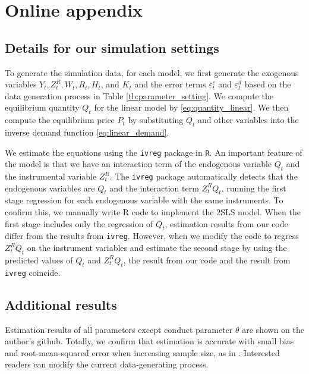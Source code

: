 \documentclass[11pt, a4paper]{article}
\begin{document}



\newpage

\setcounter{page}{1}
\appendix
\section{Online appendix}\label{sec:appendix}

\subsection{Details for our simulation settings}

To generate the simulation data, for each model, we first generate the exogenous variables $Y_{t}, Z^{R}_{t}, W_{t}, R_{t}, H_{t}$, and $K_{t}$ and the error terms $\varepsilon_{t}^c$ and $\varepsilon_{t}^d$ based on the data generation process in Table \ref{tb:parameter_setting}.
We compute the equilibrium quantity $Q_{t}$ for the linear model by \eqref{eq:quantity_linear}.
We then compute the equilibrium price $P_{t}$ by substituting $Q_{t}$ and other variables into the inverse demand function \eqref{eq:linear_demand}.

We estimate the equations using the \texttt{ivreg} package in \texttt{R}.
An important feature of the model is that we have an interaction term of the endogenous variable $Q_{t}$ and the instrumental variable $Z^{R}_{t}$.
The \texttt{ivreg} package automatically detects that the endogenous variables are $Q_{t}$ and the interaction term $Z^{R}_{t}Q_{t}$, running the first stage regression for each endogenous variable with the same instruments. To confirm this, we manually write R code to implement the 2SLS model. 
When the first stage includes only the regression of $Q_{t}$, estimation results from our code differ from the results from \texttt{ivreg}. 
However, when we modify the code to regress $Z^{R}_{t}Q_{t}$ on the instrument variables and estimate the second stage by using the predicted values of $Q_{t}$ and $Z^{R}_{t}Q_{t}$, the result from our code and the result from \texttt{ivreg} coincide.







\subsection{Additional results}
Estimation results of all parameters except conduct parameter $\theta$ are shown on the author's github. 
Totally, we confirm that estimation is accurate with small bias and root-mean-squared error when increasing sample size, as in \cite{matsumura2023resolving}.
Interested readers can modify the current data-generating process.
\end{document}

